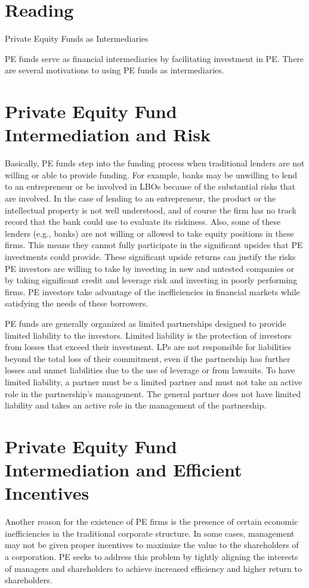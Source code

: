 \documentclass[11pt]{article}
\begin{document}
\section*{Reading}
Private Equity Funds as Intermediaries

PE funds serve as financial intermediaries by facilitating investment in PE. There are several motivations to using PE funds as intermediaries.

\section*{Private Equity Fund Intermediation and Risk}
Basically, PE funds step into the funding process when traditional lenders are not willing or able to provide funding. For example, banks may be unwilling to lend to an entrepreneur or be involved in LBOs because of the substantial risks that are involved. In the case of lending to an entrepreneur, the product or the intellectual property is not well understood, and of course the firm has no track record that the bank could use to evaluate its riskiness. Also, some of these lenders (e.g., banks) are not willing or allowed to take equity positions in these firms. This means they cannot fully participate in the significant upsides that PE investments could provide. These significant upside returns can justify the risks PE investors are willing to take by investing in new and untested companies or by taking significant credit and leverage risk and investing in poorly performing firms. PE investors take advantage of the inefficiencies in financial markets while satisfying the needs of these borrowers.

PE funds are generally organized as limited partnerships designed to provide limited liability to the investors. Limited liability is the protection of investors from losses that exceed their investment. LPs are not responsible for liabilities beyond the total loss of their commitment, even if the partnership has further losses and unmet liabilities due to the use of leverage or from lawsuits. To have limited liability, a partner must be a limited partner and must not take an active role in the partnership's management. The general partner does not have limited liability and takes an active role in the management of the partnership.

\section*{Private Equity Fund Intermediation and Efficient Incentives}
Another reason for the existence of PE firms is the presence of certain economic inefficiencies in the traditional corporate structure. In some cases, management may not be given proper incentives to maximize the value to the shareholders of a corporation. PE seeks to address this problem by tightly aligning the interests of managers and shareholders to achieve increased efficiency and higher return to shareholders.
\end{document}
